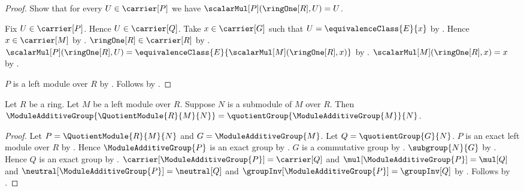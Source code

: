 \begin{proof}
    Show that for every $U\in\carrier[P]$ we have
        $\scalarMul[P](\ringOne[R],U)=U$.
    \begin{subproof}
        Fix $U\in\carrier[P]$.
        Hence $U\in\carrier[Q]$.
        Take $x\in\carrier[G]$ such that
            $U=\equivalenceClass{E}{x}$ by
            .
        Hence $x\in\carrier[M]$ by
            .
        $\ringOne[R]\in\carrier[R]$ by .
        $\scalarMul[P](\ringOne[R],U)
            =\equivalenceClass{E}{\scalarMul[M](\ringOne[R],x)}$ by
            .
        $\scalarMul[M](\ringOne[R],x)=x$ by
            .
    \end{subproof}
    $P$ is a left module over $R$ by
        .
    Follows by .
\end{proof}

\begin{theorem}\label{quotient_module_additive_group_exact}
    Let $R$ be a ring.
    Let $M$ be a left module over $R$.
    Suppose $N$ is a submodule of $M$ over $R$.
    Then
        $\ModuleAdditiveGroup{\QuotientModule{R}{M}{N}}
            =\quotientGroup{\ModuleAdditiveGroup{M}}{N}$.
\end{theorem}
\begin{proof}
    Let $P=\QuotientModule{R}{M}{N}$ and
        $G=\ModuleAdditiveGroup{M}$.
    Let $Q=\quotientGroup{G}{N}$.
    $P$ is an exact left module over $R$ by
        .
    Hence $\ModuleAdditiveGroup{P}$ is an exact group by
        .
    $G$ is a commutative group by
        .
    $\subgroup{N}{G}$ by .
    Hence $Q$ is an exact group by
        .
    $\carrier[\ModuleAdditiveGroup{P}]=\carrier[Q]$ and
        $\mul[\ModuleAdditiveGroup{P}]=\mul[Q]$ and
        $\neutral[\ModuleAdditiveGroup{P}]=\neutral[Q]$ and
        $\groupInv[\ModuleAdditiveGroup{P}]=\groupInv[Q]$ by
        .
    Follows by .
\end{proof}

